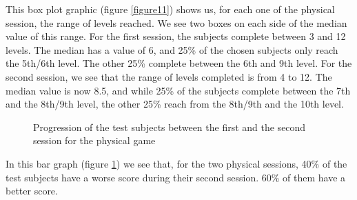 \documentclass[12pt, openany, twocolumn]{article}
\begin{document}
            This box plot graphic (figure \ref{figure11}) shows us, for each one of the physical session, the range of levels reached. We see two boxes on each side of the median value of this range.
            For the first session, the subjects complete between 3 and 12 levels. The median has a value of 6, and 25\% of the chosen subjects only reach the 5th/6th level. The other 25\% complete between the 6th and 9th level.
            For the second session, we see that the range of levels completed is from 4 to 12. The median value is now 8.5, and while 25\% of the subjects complete between the 7th and the 8th/9th level, the other 25\% reach from the 8th/9th and the 10th level.
                
                \begin{figure}[H]
                    \centering
                    \setlength{\fboxsep}{0pt}
                    \caption{Progression of the test subjects between the first and the second session for the physical game}
                    \label{figure12}
                \end{figure}

            In this bar graph (figure \ref{figure12}) we see that, for the two physical sessions, 40\% of the test subjects have a worse score during their second session.
            60\% of them have a better score.
            \\
\end{document}
